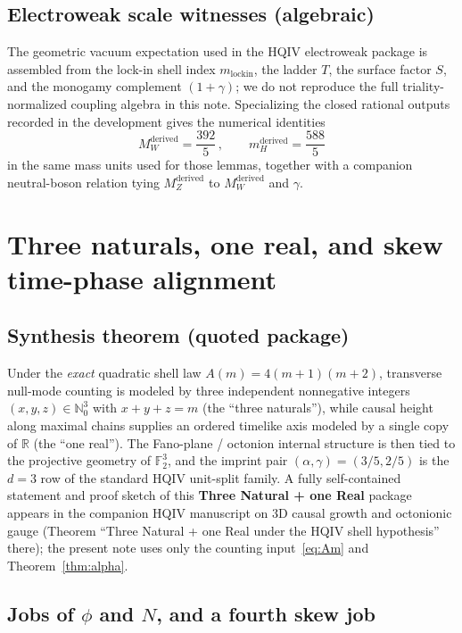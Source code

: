\documentclass[11pt,a4paper]{article}
\theoremstyle{plain}
\theoremstyle{definition}
\theoremstyle{remark}
\theoremstyle{plain}
\theoremstyle{definition}
\begin{document}
\subsection{Electroweak scale witnesses (algebraic)}

The geometric vacuum expectation used in the HQIV electroweak package is assembled from the lock-in shell index $m_{\mathrm{lockin}}$, the ladder $T$, the surface factor $S$, and the monogamy complement $(1+\gamma)$; we do not reproduce the full triality-normalized coupling algebra in this note.
Specializing the closed rational outputs recorded in the development gives the numerical identities
\begin{equation}\label{eq:MW}
  M_W^{\mathrm{derived}}=\frac{392}{5}\,,\qquad
  m_H^{\mathrm{derived}}=\frac{588}{5}
\end{equation}
in the same mass units used for those lemmas, together with a companion neutral-boson relation tying $M_Z^{\mathrm{derived}}$ to $M_W^{\mathrm{derived}}$ and $\gamma$.

\section{Three naturals, one real, and skew time-phase alignment}

\subsection{Synthesis theorem (quoted package)}

Under the \emph{exact} quadratic shell law $A(m)=4(m+1)(m+2)$, transverse null-mode counting is modeled by three independent nonnegative integers $(x,y,z)\in\mathbb{N}_0^3$ with $x+y+z=m$ (the ``three naturals''), while causal height along maximal chains supplies an ordered timelike axis modeled by a single copy of $\mathbb{R}$ (the ``one real'').
The Fano-plane / octonion internal structure is then tied to the projective geometry of $\mathbb{F}_2^3$, and the imprint pair $(\alpha,\gamma)=(3/5,2/5)$ is the $d=3$ row of the standard HQIV unit-split family.
A fully self-contained statement and proof sketch of this \textbf{Three Natural + one Real} package appears in the companion HQIV manuscript on $3$D causal growth and octonionic gauge (Theorem ``Three Natural + one Real under the HQIV shell hypothesis'' there); the present note uses only the counting input~\eqref{eq:Am} and Theorem~\ref{thm:alpha}.

\subsection{Jobs of $\phi$ and $N$, and a fourth skew job}
\end{document}
